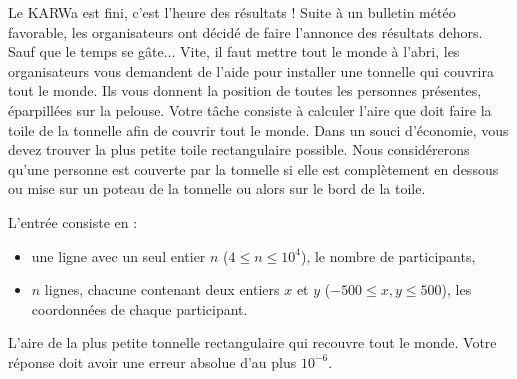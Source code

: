 \problemname{\problemyamlname}


\newcommand{\maxn}{10^4}

Le KARWa est fini, c'est l'heure des résultats ! Suite à un bulletin météo favorable, les organisateurs ont décidé de faire l'annonce des résultats dehors. Sauf que le temps se gâte... Vite, il faut mettre tout le monde à l'abri, les organisateurs vous demandent de l'aide pour installer une tonnelle qui couvrira tout le monde.
Ils vous donnent la position de toutes les personnes présentes, éparpillées sur la pelouse. Votre tâche consiste à calculer l'aire que doit faire la toile de la tonnelle afin de couvrir tout le monde. Dans un souci d'économie, vous devez trouver la plus petite toile rectangulaire possible.
Nous considérerons qu'une personne est couverte par la tonnelle si elle est complètement en dessous ou mise sur un poteau de la tonnelle ou alors sur le bord de la toile.

\begin{Input}
  L'entrée consiste en :
  \begin{itemize}
    \item une ligne avec un seul entier \(n\) (\(4 \leq n \leq \maxn\)), le nombre de participants,
    \item \(n\) lignes, chacune contenant deux entiers \(x\) et \(y\) (\(-500 \leq x, y \leq 500\)), les coordonnées de chaque participant.
  \end{itemize}
\end{Input}

\begin{Output}
  L'aire de la plus petite tonnelle rectangulaire qui recouvre tout le monde.
  Votre réponse doit avoir une erreur absolue d'au plus $10^{-6}$.
\end{Output}
